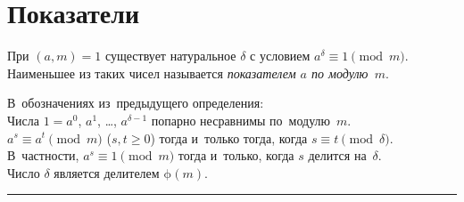 
\section*{Показатели}


\begingroup
    \ifx\mathup\undefined
        \def\eulerphi{\upphi}
    \else
        \def\eulerphi{\mathrm{\phi}}
    \fi
    \def\divides{\mathrel{\vert}}

При $(a, m) = 1$ существует натуральное $\delta$ с условием
\(
    a^{\delta} \equiv 1 \pmod{m}
\).
Наименьшее из таких чисел называется \emph{показателем $a$ по модулю~$m$}.

\begin{problems}

\item
В~обозначениях из~предыдущего определения:
\\
\subproblem
Числа $1 = a^0$, $a^1$, \ldots, $a^{\delta-1}$ попарно несравнимы
по~модулю~$m$.
\\
\subproblem
$a^s \equiv a^t \pmod{m}$ ($s, t \geq 0$)
тогда и~только тогда, когда
$s \equiv t \pmod{\delta}$.
В~частности, $a^s \equiv 1 \pmod{m}$
тогда и~только, когда
$s$ делится на~$\delta$.
\\
\subproblem
Число $\delta$ является делителем $\eulerphi(m)$.

\end{problems}

\medskip
\hrule

